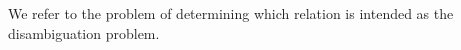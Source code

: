 \documentclass[12pt]{article}
\begin{document}
We refer to the problem of determining which relation is intended as the disambiguation problem.%
%
%
%
\end{document}
